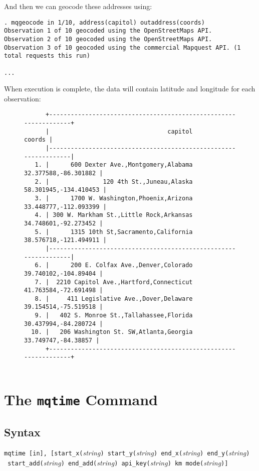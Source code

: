 \documentclass[11pt]{article}
\begin{document}
And then we can geocode these addresses using: 
\begin{verbatim}
. mqgeocode in 1/10, address(capitol) outaddress(coords)
Observation 1 of 10 geocoded using the OpenStreetMaps API.
Observation 2 of 10 geocoded using the OpenStreetMaps API.
Observation 3 of 10 geocoded using the commercial Mapquest API. (1 total requests this run)

...
\end{verbatim}
When execution is complete, the data will contain latitude and longitude for each observation:
\begin{figure}[ht]
\begin{verbatim}
      +-----------------------------------------------------------------+
      |                                 capitol                  coords |
      |-----------------------------------------------------------------|
   1. |      600 Dexter Ave.,Montgomery,Alabama    32.377588,-86.301882 |
   2. |               120 4th St.,Juneau,Alaska   58.301945,-134.410453 |
   3. |      1700 W. Washington,Phoenix,Arizona   33.448777,-112.093399 |
   4. | 300 W. Markham St.,Little Rock,Arkansas    34.748601,-92.273452 |
   5. |      1315 10th St,Sacramento,California   38.576718,-121.494911 |
      |-----------------------------------------------------------------|
   6. |      200 E. Colfax Ave.,Denver,Colorado    39.740102,-104.89404 |
   7. |  2210 Capitol Ave.,Hartford,Connecticut    41.763584,-72.691498 |
   8. |     411 Legislative Ave.,Dover,Delaware    39.154514,-75.519518 |
   9. |   402 S. Monroe St.,Tallahassee,Florida    30.437994,-84.280724 |
  10. |   206 Washington St. SW,Atlanta,Georgia     33.749747,-84.38857 |
      +-----------------------------------------------------------------+
 
\end{verbatim}
\end{figure}

\section{The \texttt{mqtime} Command}

\subsection{Syntax}

\verb|mqtime [in], [start_x(|\textit{string}\verb|) start_y(|\textit{string}\verb|) end_x(|\textit{string}\verb|) end_y(|\textit{string}\verb|)| \\\verb| start_add(|\textit{string}\verb|) end_add(|\textit{string}\verb|) api_key(|\textit{string}\verb|) km mode(|\textit{string}\verb|)]|
\end{document}
